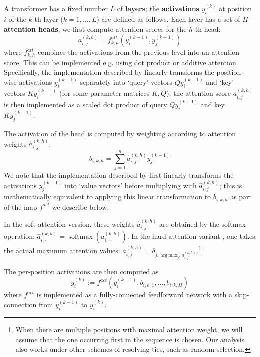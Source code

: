 \documentclass[11pt,a4paper]{article}
\DeclareMathOperator*{\argmax}{arg\,max}
\newcommand{\key}[1]{\textbf{#1}}
\begin{document}
A transformer has a fixed number $L$ of \key{layers}; the \key{activations} $y_i^{(k)}$ at position $i$ of the $k$-th layer ($k=1, \dots, L$) are defined as follows.
Each layer has a set of $H$ \key{attention heads}; we first compute attention scores for the $h$-th head:
\begin{equation}
    a_{i,j}^{(k,h)} = f^{att}_{k,h}\left(y_i^{(k-1)}, y_j^{(k-1)}\right)
\end{equation}
where $f^{att}_{k,h}$ combines the activations from the previous level into an attention score.
This can be implemented e.g. using dot product or additive attention.
Specifically, the implementation described by \citet[p. 5]{vaswani2017attention} linearly transforms the position-wise activations $y_i^{(k-1)}$ separately into `query' vectors $Q y_i^{(k-1)}$ and `key' vectors $K y_i^{(k-1)}$ (for some parameter matrices $K, Q$); %
the attention score $a_{i,j}^{(k,h)}$ is then implemented as a scaled dot product of query $Q y_i^{(k-1)}$ and key $K y_j^{(k-1)}$.


The  activation of the head is computed by weighting according to attention weights $\hat{a}_{i,j}^{(k,h)}$:
\begin{equation}
    b_{i,k,h} = \sum_{j=1}^n \hat{a}_{i,j}^{(k,h)} y_j^{(k-1)} %
\end{equation}
We note that the implementation described by \citet{vaswani2017attention} first linearly transforms the activations $y_j^{(k-1)}$ into `value vectors' before multiplying with $ \hat{a}_{i,j}^{(k,h)}$; this is mathematically equivalent to applying this linear transformation to $b_{i,k,h}$ as part of the map $f^{act}$ we describe below.

In the soft attention version, these weights $\hat{a}_{i,j}^{(k,h)}$ are obtained by the softmax operation: $\hat{a}_{i,\cdot}^{(k,h)} = \operatorname{softmax}(a_{i,\cdot}^{(k,h)})$.
In the hard attention variant \cite{perez2019turing}, one takes the actual maximum attention values:
$\hat{a}_{i,j}^{(k,h)} = \delta_{j, \argmax_{j'} a_{i,j'}^{(k,h)}}$.\footnote{When there are multiple positions with maximal attention weight, we will assume that the one occurring first in the sequence is chosen. Our analysis also works under other schemes of resolving ties, such as random selection.}

The  per-position activations are then computed as
\begin{equation}
    y_i^{(k)} := f^{act}(y_i^{(k-1)}, b_{i,k,1}, \dots, b_{i,k,H})
\end{equation}
where $f^{act}$ is implemented as a fully-connected feedforward network with a skip-connection \cite{vaswani2017attention} from $y_i^{(k-1)}$ to $y_i^{(k)}$.
\end{document}
